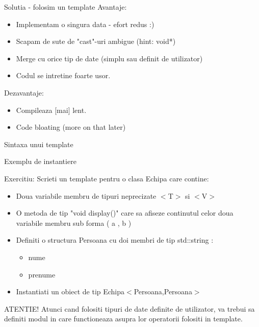 \documentclass{beamer}
\begin{document}
  \frame{\tableofcontents[currentsection]}

  \begin{frame}{Solutia - folosim un template}
  Avantaje:
  \begin{itemize}
  \pause \item Implementam o singura data - efort redus :)
  \pause \item Scapam de sute de "cast"-uri ambigue (hint: void*)
  \pause \item Merge cu orice tip de date (simplu sau definit de utilizator)
  \pause \item Codul se intretine foarte usor. 
  \end{itemize}
  \pause Dezavantaje:
  \begin{itemize}
  \pause \item Compileaza [mai] lent.
  \pause \item Code bloating (more on that later)
  \end{itemize}
  \end{frame}

  \begin{frame}{Sintaxa unui template}
  
  \end{frame}
 
  \begin{frame}{Exemplu de instantiere}
  
  \end{frame}

  \begin{frame}{Exercitiu:}
  Scrieti un template pentru o clasa Echipa care contine:
  \begin{itemize}
  \item Doua variabile membru de tipuri neprecizate $<$T$>$ si $<$V$>$
  \item O metoda de tip "void display()" care sa afiseze continutul celor doua variabile membru sub forma ( a , b )
  \item Definiti o structura Persoana cu doi membri de tip std::string : \begin{itemize} \item nume \item prenume \end{itemize}
  \item Instantiati un obiect de tip Echipa$<$Persoana,Persoana$>$
  \end{itemize}
  ATENTIE! Atunci cand folositi tipuri de date definite de utilizator, va trebui sa definiti modul in care functioneaza asupra lor operatorii folositi in template.
  \end{frame}
\end{document}
